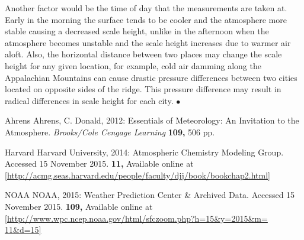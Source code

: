 \documentclass[twocolumn]{article}
\begin{document}
Another factor would be the time of day that the measurements are taken at. Early in the morning the surface tends to be cooler and the atmosphere more stable causing a decreased scale height, unlike in the afternoon when the atmosphere becomes unstable and the scale height increases due to warmer air aloft. Also, the horizontal distance between two places may change the scale height for any given location, for example, cold air damming along the Appalachian Mountains can cause drastic pressure differences between two cities located on opposite sides of the ridge. This pressure difference may result in radical differences in scale height for each city. $\bullet$ 





\begin{references}

{\footnotesize
%
\item{Ahrens} 
Ahrens, C. Donald, 2012: Essentials of Meteorology: An Invitation to the Atmosphere.
\textit{Brooks/Cole Cengage Learning}
\textbf{109,} 506 pp.


\item{Harvard}
Harvard University, 2014: Atmospheric Chemistry Modeling Group. Accessed 15 November 2015. 
\textbf{11,} Available online at 
\\\url{[http://acmg.seas.harvard.edu/people/faculty/djj/book/bookchap2.html]}


\item{NOAA} 
NOAA, 2015: Weather Prediction Center \& Archived Data. Accessed 15 November 2015.
\textbf{109,} Available online at
\\\url{[http://www.wpc.ncep.noaa.gov/html/sfczoom.php?h=15&y=2015&m= 11&d=15]}




}	%
\end{references}
\end{document}
